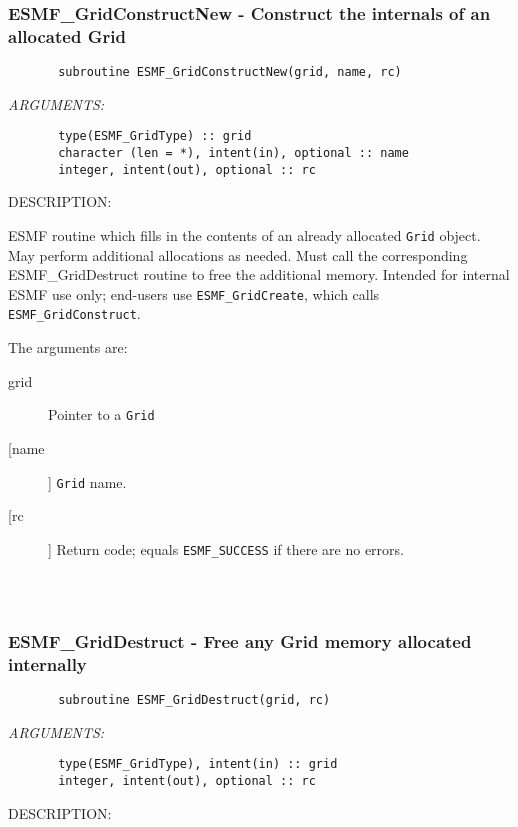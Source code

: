 \subsubsection{ESMF\_GridConstructNew - Construct the internals of an allocated Grid}


\begin{verbatim}       subroutine ESMF_GridConstructNew(grid, name, rc)\end{verbatim}{\em ARGUMENTS:}
\begin{verbatim}       type(ESMF_GridType) :: grid
       character (len = *), intent(in), optional :: name
       integer, intent(out), optional :: rc\end{verbatim}
{\sf DESCRIPTION:\\ }


       ESMF routine which fills in the contents of an already
       allocated {\tt Grid} object.  May perform additional allocations
       as needed.  Must call the corresponding ESMF\_GridDestruct
       routine to free the additional memory.  Intended for internal
       ESMF use only; end-users use {\tt ESMF\_GridCreate}, which calls
       {\tt ESMF\_GridConstruct}.
  
       The arguments are:
       \begin{description}
       \item[grid]
            Pointer to a {\tt Grid}
       \item[[name]]
            {\tt Grid} name.
       \item[[rc]]
            Return code; equals {\tt ESMF\_SUCCESS} if there are no errors.
       \end{description}
  
\begin{verbatim} \end{verbatim}
 
 
\mbox{}\hrulefill\ 
 
\subsubsection{ESMF\_GridDestruct - Free any Grid memory allocated internally}


\begin{verbatim}       subroutine ESMF_GridDestruct(grid, rc)\end{verbatim}{\em ARGUMENTS:}
\begin{verbatim}       type(ESMF_GridType), intent(in) :: grid
       integer, intent(out), optional :: rc\end{verbatim}
{\sf DESCRIPTION:\\ }


